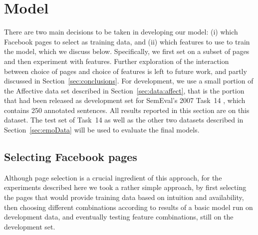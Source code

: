 \documentclass[11pt]{article}
\begin{document}




\section{Model}
\label{sec:model}


There are two main decisions to be taken in developing our model: (i) which Facebook pages to select as training data, and (ii) which features to use to train the model, which we discuss below. Specifically, we first set on a subset of pages and then experiment with features. Further exploration of the interaction between choice of pages and choice of features is left to future work, and partly discussed in Section~\ref{sec:conclusions}. For development, we use a small portion of the Affective data set described in Section~\ref{sec:data:affect}, that is the portion that had been released as development set for SemEval's 2007 Task~14 \cite{strapparava2007semeval}, which contains 250 annotated sentences. All results reported in this section are on this dataset.
  The test set of Task~14 as well as the other two datasets described in Section~\ref{sec:emoData} will be used to evaluate the final models.





\subsection{Selecting Facebook pages}
\label{sec:selecting}

Although page selection is a crucial ingredient of this approach, for the experiments described here we took a rather simple approach, by first selecting the pages that would provide training data based on intuition and availability, then choosing different combinations according to results of a basic model run on development data, and eventually testing feature combinations, still on the development set.
\end{document}
